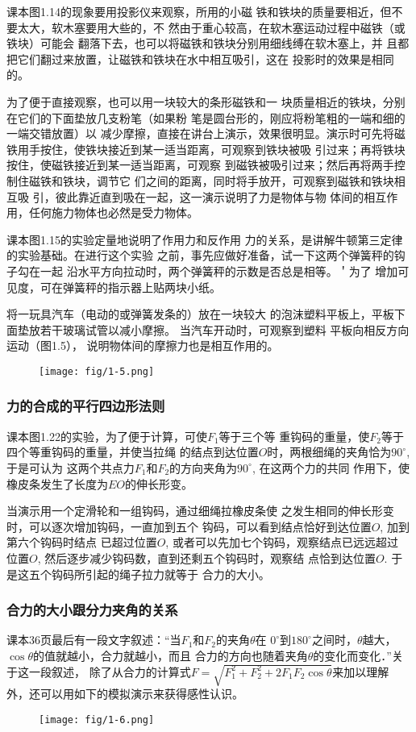 课本图1.14的现象要用投影仪来观察，所用的小磁
铁和铁块的质量要相近，但不要太大，软木塞要用大些的，不
然由于重心较高，在软木塞运动过程中磁铁（或铁块）可能会
翻落下去，也可以将磁铁和铁块分别用细线缚在软木塞上，并
且都把它们翻过来放置，让磁铁和铁块在水中相互吸引，这在
投影时的效果是相同的。

为了便于直接观察，也可以用一块较大的条形磁铁和一
块质量相近的铁块，分别在它们的下面垫放几支粉笔（如果粉
笔是圆台形的，刚应将粉笔粗的一端和细的一端交错放置）以
减少摩擦，直接在讲台上演示，效果很明显。演示时可先将磁
铁用手按住，使铁块接近到某一适当距离，可观察到铁块被吸
引过来；再将铁块按住，使磁铁接近到某一适当距离，可观察
到磁铁被吸引过来；然后再将两手控制住磁铁和铁块，调节它
们之间的距离，同时将手放开，可观察到磁铁和铁块相互吸
引，彼此靠近直到吸在一起，这一演示说明了力是物体与物
体间的相互作用，任何施力物体也必然是受力物体。

课本图1.15的实验定量地说明了作用力和反作用
力的关系，是讲解牛顿第三定律的实验基础。在进行这个实验
之前，事先应做好准备，试一下这两个弹簧秤的钩子勾在一起
沿水平方向拉动时，两个弹簧秤的示数是否总是相等。＇为了
增加可见度，可在弹簧秤的指示器上贴两块小纸。

将一玩具汽车（电动的或弹簧发条的）放在一块较大
的泡沫塑料平板上，平板下面垫放若干玻璃试管以减小摩擦。
当汽车开动时，可观察到塑料
平板向相反方向运动（图1.5），
说明物体间的摩擦力也是相互作用的。
\begin{figure}[htp]
    \centering
    \texttt{[image: fig/1-5.png]}
    \caption{}
\end{figure}

\subsubsection{力的合成的平行四边形法则}
课本图1.22的实验，为了便于计算，可使$F_1$等于三个等
重钩码的重量，使$F_2$等于四个等重钩码的重量，并使当拉绳
的结点到达位置$O$时，两根细绳的夹角恰为$90^{\circ}$, 于是可认为
这两个共点力$F_1$和$F_2$的方向夹角为$90^{\circ}$, 在这两个力的共同
作用下，使橡皮条发生了长度为$EO$的伸长形变。

当演示用一个定滑轮和一组钩码，通过细绳拉橡皮条使
之发生相同的伸长形变时，可以逐次增加钩码，一直加到五个
钩码，可以看到结点恰好到达位置$O$, 加到第六个钩码时结点
已超过位置$O$, 或者可以先加七个钩码，观察结点已远远超过
位置$O$, 然后逐步减少钩码数，直到还剩五个钩码时，观察结
点恰到达位置$O$. 于是这五个钩码所引起的绳子拉力就等于
合力的大小。

\subsubsection{合力的大小跟分力夹角的关系}
课本36页最后有一段文字叙述：“当$F_1$和$F_2$的夹角$\theta$在
$0^{\circ}$到$180^{\circ}$之间时，$\theta$越大，$\cos\theta$的值就越小，合力就越小，而且
合力的方向也随着夹角$\theta$的变化而变化．”关于这一段叙述，
除了从合力的计算式$F=\sqrt{F^2_1+F^2_2+2F_1F_2\cos\theta}$来加以理解
外，还可以用如下的模拟演示来获得感性认识。
\begin{figure}[htp]
    \centering
    \texttt{[image: fig/1-6.png]}
    \caption{}
\end{figure}


